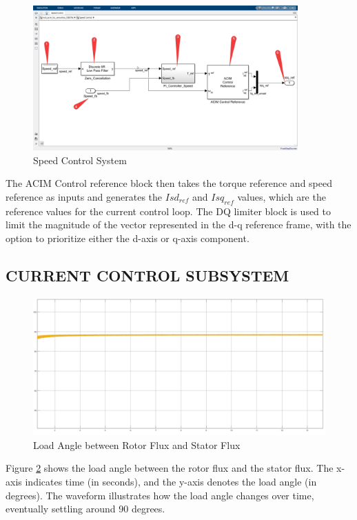 \begin{figure}[H]
	\centering
	\includegraphics[width=4in]{sections/section3/images/simulation/speedControl/speedController.png}
	\caption{Speed Control System}
	\label{fig:speed_control_system}
\end{figure}


The ACIM Control reference block then takes the torque reference and speed reference as inputs and generates the $Isd_{ref}$ and $Isq_{ref}$ values, which are the reference values for the current control loop. The DQ limiter block is used to limit the magnitude of the vector represented in the d-q reference frame, with the option to prioritize either the d-axis or q-axis component.


\subsection{CURRENT CONTROL SUBSYSTEM}


\begin{figure}[H]
	\centering
	\includegraphics[width=6in]{sections/section3/images/simulationResutls/LoadAngle.png}
	\caption{Load Angle between Rotor Flux and Stator Flux}
	\label{fig:load_angle_1}
\end{figure}

Figure \ref{fig:load_angle_1} shows the load angle between the rotor flux and the stator flux. The x-axis indicates time (in seconds), and the y-axis denotes the load angle (in degrees). The waveform illustrates how the load angle changes over time, eventually settling around 90 degrees.

